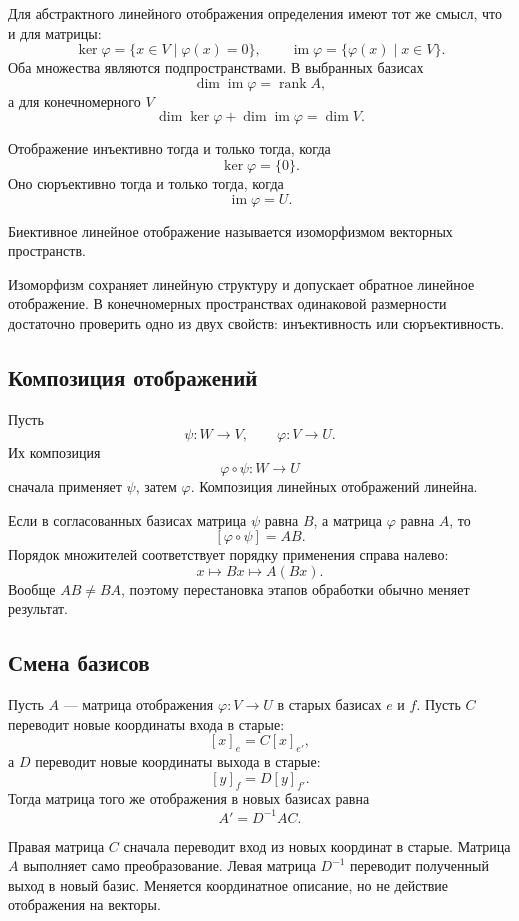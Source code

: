 Для абстрактного линейного отображения определения имеют тот же смысл, что и для матрицы:
\[
\ker\varphi
=
\{x\in V\mid \varphi(x)=0\},
\qquad
\operatorname{im}\varphi
=
\{\varphi(x)\mid x\in V\}.
\]
Оба множества являются подпространствами. В выбранных базисах
\[
\dim\operatorname{im}\varphi=\operatorname{rank}A,
\]
а для конечномерного \(V\)
\[
\dim\ker\varphi+\dim\operatorname{im}\varphi=\dim V.
\]

Отображение инъективно тогда и только тогда, когда
\[
\ker\varphi=\{0\}.
\]
Оно сюръективно тогда и только тогда, когда
\[
\operatorname{im}\varphi=U.
\]

\begin{definition}
Биективное линейное отображение называется изоморфизмом векторных пространств.
\end{definition}

Изоморфизм сохраняет линейную структуру и допускает обратное линейное отображение. В конечномерных пространствах одинаковой размерности достаточно проверить одно из двух свойств: инъективность или сюръективность.

\subsection{Композиция отображений}

Пусть
\[
\psi\colon W\to V,
\qquad
\varphi\colon V\to U.
\]
Их композиция
\[
\varphi\circ\psi\colon W\to U
\]
сначала применяет \(\psi\), затем \(\varphi\). Композиция линейных отображений линейна.

Если в согласованных базисах матрица \(\psi\) равна \(B\), а матрица
\(\varphi\) равна \(A\), то
\[
[\varphi\circ\psi]=AB.
\]
Порядок множителей соответствует порядку применения справа налево:
\[
x
\longmapsto
Bx
\longmapsto
A(Bx).
\]
Вообще \(AB\neq BA\), поэтому перестановка этапов обработки обычно меняет результат.

\subsection{Смена базисов}

Пусть \(A\) --- матрица отображения \(\varphi\colon V\to U\) в старых базисах \(e\) и \(f\). Пусть \(C\) переводит новые координаты входа в старые:
\[
[x]_e=C[x]_{e'},
\]
а \(D\) переводит новые координаты выхода в старые:
\[
[y]_f=D[y]_{f'}.
\]
Тогда матрица того же отображения в новых базисах равна
\[
A'=D^{-1}AC.
\]

Правая матрица \(C\) сначала переводит вход из новых координат в старые. Матрица \(A\) выполняет само преобразование. Левая матрица \(D^{-1}\) переводит полученный выход в новый базис. Меняется координатное описание, но не действие отображения на векторы.

